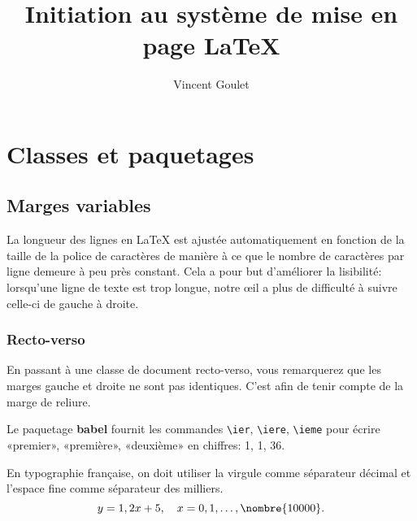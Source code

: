 \documentclass[11pt,french]{memoir}
\title{Initiation au système de mise en page \LaTeX}
\author{Vincent Goulet}
\begin{document}
\maketitle

\chapter{Classes et paquetages}

\section{Marges variables}

La longueur des lignes en {\LaTeX} est ajustée automatiquement en
fonction de la taille de la police de caractères de manière à ce que le
nombre de caractères par ligne demeure à peu près constant. Cela a
pour but d'améliorer la lisibilité: lorsqu'une ligne de texte est trop
longue, notre œil a plus de difficulté à suivre celle-ci de gauche à
droite.

\subsection{Recto-verso}

En passant à une classe de document recto-verso, vous remarquerez que
les marges gauche et droite ne sont pas identiques. C'est afin de
tenir compte de la marge de reliure.

Le paquetage \textbf{babel} fournit les commandes \verb=\ier=,
\verb=\iere=, \verb=\ieme= pour écrire «premier», «première»,
«deuxième» en chiffres: 1{\ier}, 1{\iere}, 36{\ieme}.

En typographie française, on doit utiliser la virgule comme séparateur
décimal et l'espace fine comme séparateur des milliers.
\begin{displaymath}
  y = 1,2x + 5, \quad x = 0, 1, \dots, \nombre{10 000}.
\end{displaymath}
\end{document}
